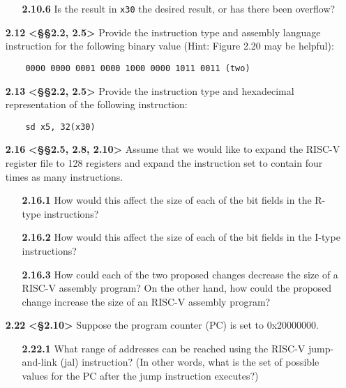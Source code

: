 \documentclass[11pt]{article}
\begin{document}
\begin{enumerate}
\begin{enumerate}
        \item[\textbf{2.10.6}] Is the result in \texttt{x30} the desired result, or has there been 
        overflow?
    \end{enumerate}

    \item[\textbf{2.12}] \textbf{<§§2.2, 2.5>} Provide the instruction type and assembly language 
    instruction for the following binary value (Hint: Figure 2.20 may be helpful): 
    \begin{verbatim}
    0000 0000 0001 0000 1000 0000 1011 0011 (two)
    \end{verbatim}
    
    \item[\textbf{2.13}] \textbf{<§§2.2, 2.5>} Provide the instruction type and hexadecimal representation of the following instruction:
    \begin{verbatim}
    sd x5, 32(x30)
    \end{verbatim}

    \item[\textbf{2.16}] \textbf{<§§2.5, 2.8, 2.10>} Assume that we would like to expand the RISC-V register file to 128 registers 
    and expand the instruction set to contain four times as many instructions.
    
    \begin{enumerate}
        \item[\textbf{2.16.1}] How would this affect the size of each of the bit fields in the 
        R-type instructions?
        
        \item[\textbf{2.16.2}] How would this affect the size of each of the bit fields in the 
        I-type instructions?
        
        \item[\textbf{2.16.3}] How could each of the two proposed changes 
        decrease the size of a RISC-V assembly program? On the other hand, how could 
        the proposed change increase the size of an RISC-V assembly program?
    \end{enumerate}

    \item[\textbf{2.22}] \textbf{<§2.10>} Suppose the program counter (PC) is set to 0x20000000.
    
    \begin{enumerate}
        \item[\textbf{2.22.1}] What range of addresses can be reached using the RISC-V 
        jump-and-link (jal) instruction? (In other words, what is the set of possible values 
        for the PC after the jump instruction executes?)
        

\end{enumerate}
\end{enumerate}
\end{document}
